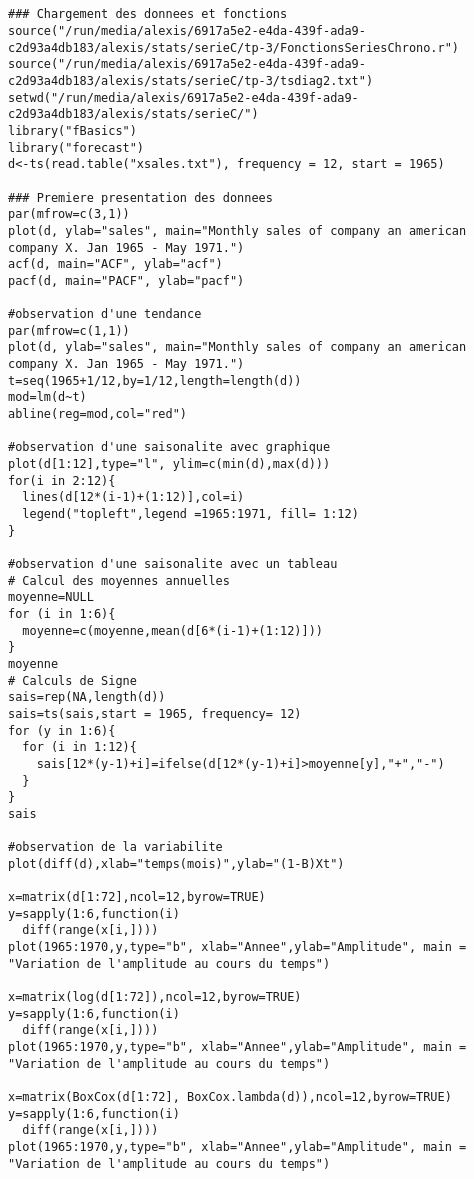 \documentclass[11pt,a4paper]{article}
\begin{document}
\lstset{language=R}
\begin{lstlisting}[breaklines]


### Chargement des donnees et fonctions
source("/run/media/alexis/6917a5e2-e4da-439f-ada9-c2d93a4db183/alexis/stats/serieC/tp-3/FonctionsSeriesChrono.r")
source("/run/media/alexis/6917a5e2-e4da-439f-ada9-c2d93a4db183/alexis/stats/serieC/tp-3/tsdiag2.txt")
setwd("/run/media/alexis/6917a5e2-e4da-439f-ada9-c2d93a4db183/alexis/stats/serieC/")
library("fBasics")
library("forecast")
d<-ts(read.table("xsales.txt"), frequency = 12, start = 1965)

### Premiere presentation des donnees
par(mfrow=c(3,1))
plot(d, ylab="sales", main="Monthly sales of company an american company X. Jan 1965 - May 1971.")
acf(d, main="ACF", ylab="acf")
pacf(d, main="PACF", ylab="pacf")

#observation d'une tendance
par(mfrow=c(1,1))
plot(d, ylab="sales", main="Monthly sales of company an american company X. Jan 1965 - May 1971.")
t=seq(1965+1/12,by=1/12,length=length(d))
mod=lm(d~t)
abline(reg=mod,col="red")

#observation d'une saisonalite avec graphique
plot(d[1:12],type="l", ylim=c(min(d),max(d)))
for(i in 2:12){
  lines(d[12*(i-1)+(1:12)],col=i)
  legend("topleft",legend =1965:1971, fill= 1:12)
}

#observation d'une saisonalite avec un tableau
# Calcul des moyennes annuelles
moyenne=NULL
for (i in 1:6){
  moyenne=c(moyenne,mean(d[6*(i-1)+(1:12)]))
}
moyenne
# Calculs de Signe
sais=rep(NA,length(d))
sais=ts(sais,start = 1965, frequency= 12)
for (y in 1:6){
  for (i in 1:12){
    sais[12*(y-1)+i]=ifelse(d[12*(y-1)+i]>moyenne[y],"+","-")
  }
}
sais

#observation de la variabilite
plot(diff(d),xlab="temps(mois)",ylab="(1-B)Xt")

x=matrix(d[1:72],ncol=12,byrow=TRUE)
y=sapply(1:6,function(i)
  diff(range(x[i,])))
plot(1965:1970,y,type="b", xlab="Annee",ylab="Amplitude", main = "Variation de l'amplitude au cours du temps")

x=matrix(log(d[1:72]),ncol=12,byrow=TRUE)
y=sapply(1:6,function(i)
  diff(range(x[i,])))
plot(1965:1970,y,type="b", xlab="Annee",ylab="Amplitude", main = "Variation de l'amplitude au cours du temps")

x=matrix(BoxCox(d[1:72], BoxCox.lambda(d)),ncol=12,byrow=TRUE)
y=sapply(1:6,function(i)
  diff(range(x[i,])))
plot(1965:1970,y,type="b", xlab="Annee",ylab="Amplitude", main = "Variation de l'amplitude au cours du temps")



\end{lstlisting}
\end{document}
